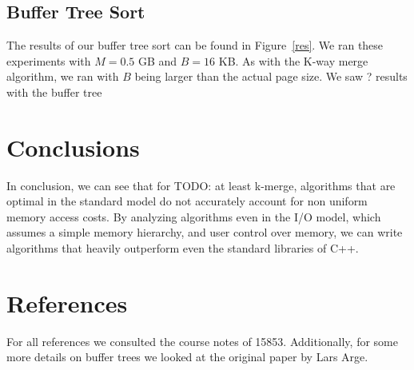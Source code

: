 \documentclass{article}
\begin{document}
\subsection{Buffer Tree Sort}

The results of our buffer tree sort can be found in Figure~\ref{res}.
%
We ran these experiments with $M = 0.5$ GB and $B = 16$ KB.
%
As with the K-way merge algorithm, we ran with $B$ being larger than the actual page size.
%
We saw ? results with the buffer tree


\section{Conclusions}

In conclusion, we can see that for TODO: at least k-merge,
algorithms that are optimal in the standard model do not accurately
account for non uniform memory access costs.
%
By analyzing algorithms even in the I/O model, which assumes
a simple memory hierarchy, and user control over memory,
we can write algorithms that heavily outperform
even the standard libraries of C++.

\section{References}

For all references we consulted the course notes of 15853.
%
Additionally, for some more details on buffer trees we looked at the
original paper by Lars Arge.
\end{document}
